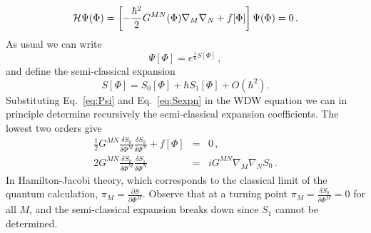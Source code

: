 \documentclass[a4paper,11pt]{article}
\numberwithin{equation}{section}
\begin{document}
\begin{equation}
{\cal H} \Psi(\Phi) = \left[-\frac{\hbar^{2}}{2}G^{MN}(\Phi)\nabla_{M}\nabla_{N}+f[\Phi]\right]\Psi(\Phi) =0 \,.\label{eq:WD}
\end{equation}
As usual we can write
\begin{equation}
\Psi[\Phi]=e^{\frac{i}{\hbar}S[\Phi]} \,,\label{eq:Psi}
\end{equation}
and define the semi-classical expansion
\begin{equation}
S[\Phi]=S_{0}[\Phi]+\hbar S_{1}[\Phi]+O(\hbar^{2}).\label{eq:Sexpn}
\end{equation}
Substituting Eq.~\eqref{eq:Psi} and Eq.~\eqref{eq:Sexpn} in the WDW equation we can in principle determine recursively the semi-classical expansion coefficients. The lowest two orders give
\begin{eqnarray}
\frac{1}{2}G^{MN}\frac{\delta S_{0}}{\delta\Phi^{M}}\frac{\delta S_{0}}{\delta\Phi^{N}}+f[\Phi] & = & 0\label{eq:HJ} \,,\\
2G^{MN}\frac{\delta S_{0}}{\delta\Phi^{M}}\frac{\delta S_{1}}{\delta\Phi^{N}} & = & iG^{MN}\nabla_{M}\nabla_{N}S_{0} \,. \label{eq:prefactoreqn}
\end{eqnarray}
In Hamilton-Jacobi theory, which corresponds to the classical limit of the quantum calculation, $\pi_M=\frac{\partial S}{\partial\Phi^M}$. Observe that at a turning point $\pi_{M}=\frac{\delta S_{0}}{\delta\Phi^{M}}=0$ for all $M$, and
the semi-classical expansion breaks down since $S_{1}$ cannot be
determined. 
\end{document}
